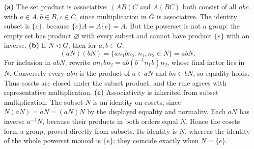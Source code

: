 \textbf{(a)} The set product is associative: $(AB)C$ and $A(BC)$ both consist of all $abc$ with $a\in A,b\in B,c\in C$, since multiplication in $G$ is associative. The identity subset is $\{e\}$, because $\{e\}A=A\{e\}=A$. But the powerset is not a group: the empty set has product $\varnothing$ with every subset and cannot have product $\{e\}$ with an inverse.
\textbf{(b)} If $N\triangleleft G$, then for $a,b\in G$,
\[(aN)(bN)=\{an_1bn_2:n_1,n_2\in N\}=abN.\]
For inclusion in $abN$, rewrite $an_1bn_2=ab(b^{-1}n_1b)n_2$, whose final factor lies in $N$. Conversely every $abn$ is the product of $a\in aN$ and $bn\in bN$, so equality holds. Thus cosets are closed under the subset product, and the rule agrees with representative multiplication.
\textbf{(c)} Associativity is inherited from subset multiplication. The subset $N$ is an identity on cosets, since $N(aN)=aN=(aN)N$ by the displayed equality and normality. Each $aN$ has inverse $a^{-1}N$, because their products in both orders equal $N$. Hence the cosets form a group, proved directly from subsets. Its identity is $N$, whereas the identity of the whole powerset monoid is $\{e\}$; they coincide exactly when $N=\{e\}$.

